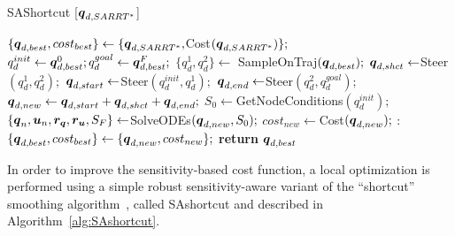 \begin{algorithm}[htp]
    \caption{SAShortcut [$\boldsymbol{q}_{d,SARRT^*}$]}\label{alg:SAshortcut}
    \begin{algorithmic}[1]
        \State $\{\boldsymbol{q}_{d,best}, cost_{best}\} \gets \{\boldsymbol{q}_{d,SARRT^*}, $Cost$(\boldsymbol{q}_{d,SARRT^*}) \};$
        \State $q_d^{init} \gets \boldsymbol{q}_{d,best}^0; q_d^{goal} \gets \boldsymbol{q}_{d,best}^F;$
            \State $\{q_d^{1}, q_d^{2}\} \gets$ SampleOnTraj$(\boldsymbol{q}_{d,best});$
            \State $\boldsymbol{q}_{d,shct} \gets $Steer$(q_d^{1}, q_d^{2});$
                \State $\boldsymbol{q}_{d,start} \gets $Steer$(q_d^{init}, q_d^{1});$
                \State $\boldsymbol{q}_{d,end} \gets $Steer$(q_d^{2}, q_d^{goal});$
                \State $\boldsymbol{q}_{d,new} \gets \boldsymbol{q}_{d,start}+\boldsymbol{q}_{d,shct}+\boldsymbol{q}_{d,end};$
                \State $S_0 \gets $GetNodeConditions$(q_d^{init});$
                \State $\{\boldsymbol{q}_n, \boldsymbol{u}_n, \boldsymbol{r_q}, \boldsymbol{r_u}, S_F\}  \gets $SolveODEs$(\boldsymbol{q}_{d,new}, S_0);$
                \State $cost_{new} \gets $Cost$(\boldsymbol{q}_{d,new});$
                :   
                        \State $\{\boldsymbol{q}_{d,best}, cost_{best}\} \gets \{\boldsymbol{q}_{d,new}, cost_{new}\};$
                    \EndIf
                \EndIf
            \EndIf
        \EndWhile
    \State \textbf{return} $\boldsymbol{q}_{d,best}$
    \end{algorithmic}
\end{algorithm}

In order to improve the sensitivity-based cost function, a local optimization is performed using a simple robust sensitivity-aware variant of the ``shortcut'' smoothing algorithm~\cite{cShortcut}, called \gls{SAshortcut} and described in Algorithm~\ref{alg:SAshortcut}. 

